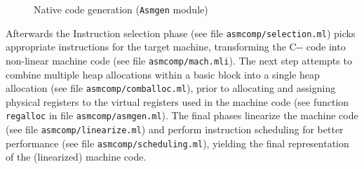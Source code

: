 \documentclass[10pt,a4paper,draft,twocolumn]{article}
\begin{document}
\begin{figure}[htb]
  \centering
  \caption{Native code generation (\texttt{Asmgen} module)}
  \label{fig:Native_code_generation}
\end{figure}

Afterwards the Instruction selection phase (see file \texttt{asmcomp/selection.ml}) picks appropriate
instructions for the target machine, transforming the C\mbox{-}\mbox{-} code into non-linear machine
code (see file \texttt{asmcomp/mach.mli}). The next step attempts to combine multiple heap allocations
within a basic block into a single heap allocation (see file \texttt{asmcomp/comballoc.ml}), prior to
allocating and assigning physical registers to the virtual registers used in the machine code (see
function \texttt{regalloc} in file \texttt{asmcomp/asmgen.ml}).
The final phases linearize the machine code (see file \texttt{asmcomp/linearize.ml}) and perform
instruction scheduling for better performance (see file \texttt{asmcomp/scheduling.ml}), yielding the
final representation of the (linearized) machine code.
\end{document}
